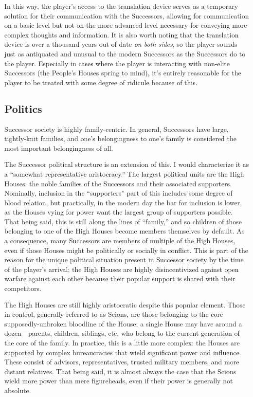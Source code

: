 \documentclass[11pt]{report}
\begin{document}
    In this way, the player's access to the translation device serves as a temporary solution for their communication with the Successors, allowing for communication on a basic level but not on the more advanced level necessary for conveying more complex thoughts and information. It is also worth noting that the translation device is over a thousand years out of date \emph{on both sides}, so the player sounds just as antiquated and unusual to the modern Successors as the Successors do to the player. Especially in cases where the player is interacting with non-elite Successors (the People's Houses spring to mind), it's entirely reasonable for the player to be treated with some degree of ridicule because of this.

    \subsection{Politics}
    Successor society is highly family-centric. In general, Successors have large, tightly-knit families, and one's belongingness to one's family is considered the most important belongingness of all. 

    The Successor political structure is an extension of this. I would characterize it as a ``somewhat representative aristocracy.'' The largest political units are the High Houses: the noble families of the Successors and their associated supporters. Nominally, inclusion in the ``supporters'' part of this includes some degree of blood relation, but practically, in the modern day the bar for inclusion is lower, as the Houses vying for power want the largest group of supporters possible. That being said, this is still along the lines of ``family,'' and so children of those belonging to one of the High Houses become members themselves by default. As a consequence, many Successors are members of multiple of the High Houses, even if those Houses might be politically or socially in conflict. This is part of the reason for the unique political situation present in Successor society by the time of the player's arrival; the High Houses are highly disincentivized against open warfare against each other because their popular support is shared with their competitors.
    
    The High Houses are still highly aristocratic despite this popular element. Those in control, generally referred to as Scions, are those belonging to the core supposedly-unbroken bloodline of the House; a single House may have around a dozen---parents, children, siblings, etc, who belong to the current generation of the core of the family. In practice, this is a little more complex: the Houses are supported by complex bureaucracies that wield significant power and influence. These consist of advisors, representatives, trusted military members, and more distant relatives. That being said, it is almost always the case that the Scions wield more power than mere figureheads, even if their power is generally not absolute.
    
\end{document}
